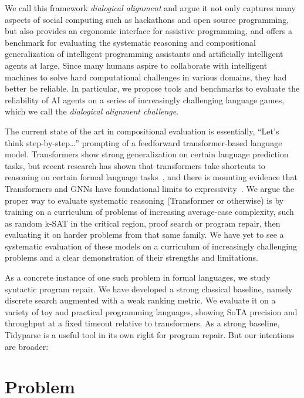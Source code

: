 \documentclass[sigplan,screen]{acmart}
\begin{document}
We call this framework \emph{dialogical alignment} and argue it not only captures many aspects of social computing such as hackathons and open source programming, but also provides an ergonomic interface for assistive programming, and offers a benchmark for evaluating the systematic reasoning and compositional generalization of intelligent programming assistants and artificially intelligent agents at large. Since many humans aspire to collaborate with intelligent machines to solve hard computational challenges in various domains, they had better be reliable. In particular, we propose tools and benchmarks to evaluate the reliability of AI agents on a series of increasingly challenging language games, which we call the \emph{dialogical alignment challenge}.

The current state of the art in compositional evaluation is essentially, ``Let's think step-by-step\ldots'' prompting of a feedforward transformer-based language model. Transformers show strong generalization on certain language prediction tasks, but recent research has shown that transformers take shortcuts to reasoning on certain formal language tasks~\cite{dziri2023faith, liu2022transformers}, and there is mounting evidence that Transformers and GNNs have foundational limits to expressivity~\cite{merrill2022saturated, chiang2023tighter}. We argue the proper way to evaluate systematic reasoning (Transformer or otherwise) is by training on a curriculum of problems of increasing average-case complexity, such as random k-SAT in the critical region, proof search or program repair, then evaluating it on harder problems from that same family. We have yet to see a systematic evaluation of these models on a curriculum of increasingly challenging problems and a clear demonstration of their strengths and limitations.



As a concrete instance of one such problem in formal languages, we study syntactic program repair. We have developed a strong classical baseline, namely discrete search augmented with a weak ranking metric. We evaluate it on a variety of toy and practical programming languages, showing SoTA precision and throughput at a fixed timeout relative to transformers. As a strong baseline, Tidyparse is a useful tool in its own right for program repair. But our intentions are broader:



\section{Problem}
\end{document}
